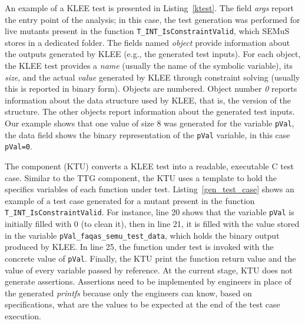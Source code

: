 An example of a KLEE test is presented in Listing~\ref{ktest}. The field \emph{args} report the entry point of the analysis; in this case, the test generation was performed for live mutants present in the function \texttt{T\_INT\_IsConstraintValid}, which SEMuS stores in a dedicated folder. The fields named \emph{object} provide information about the outputs generated by KLEE (e.g., the generated test inputs). 
For each object, the KLEE test provides a \emph{name} (usually the name of the symbolic variable), its \emph{size}, and the actual \emph{value} generated by KLEE through constraint solving (usually this is reported in binary form).
Objects are numbered. Object number \emph{0} reports information about the data structure used by KLEE, that is, the version of the structure. The other objects report information about the generated test inputs.
Our example shows that one value of size 8 was generated for the variable \texttt{pVal}, the data field shows the binary representation of the \texttt{pVal} variable, in this case \texttt{pVal=0}.






The component  (KTU) converts a KLEE test into a readable, executable C test case. Similar to the TTG component, the KTU uses a template to hold the specifics variables of each function under test. 
Listing~\ref{gen_test_case} shows an example of a test case generated for a mutant present in the function \texttt{T\_INT\_IsConstraintValid}. For instance, line 20 shows that the variable \texttt{pVal} is initially filled with 0 (to clean it), then in line 21, it is filled with the value stored in the variable \texttt{pVal\_faqas\_semu\_test\_data}, which holds the binary output produced by KLEE. In line 25, the function under test is invoked with the concrete value of \texttt{pVal}. Finally, the KTU print the function return value and the value of every variable passed by reference.
At the current stage, KTU does not generate assertions. Assertions need to be implemented by engineers in place of the generated \emph{printfs} because only the engineers can know, based on specifications, what are the values to be expected at the end of the test case execution.


\ENDCHANGEDWPT
